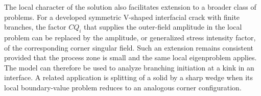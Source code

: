The local character of the solution also facilitates extension to a
broader class of problems. For a developed symmetric V-shaped interfacial
crack with finite branches, the factor $CQ_i$ that supplies the outer-field
amplitude in the local problem can be replaced by the amplitude, or
generalized stress intensity factor, of the corresponding corner singular
field. Such an extension remains consistent provided that the process zone
is small and the same local eigenproblem applies. The model can therefore
be used to analyze branching initiation at a kink in an interface. A
related application is splitting of a solid by a sharp wedge when its
local boundary-value problem reduces to an analogous corner configuration.
